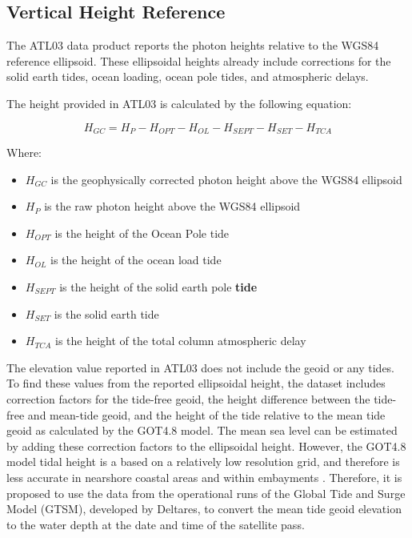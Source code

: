 \subsection{Vertical Height Reference}

The ATL03 data product reports the photon heights relative to the WGS84 reference ellipsoid. These ellipsoidal heights already include corrections for the solid earth tides, ocean loading, ocean pole tides, and atmospheric delays.

The height provided in ATL03 is calculated by the following equation:

\[H_{GC} =  H_{P} - H_{OPT} - H_{OL} - H_{SEPT} - H_{SET} - H_{TCA}\]

Where:

\begin{itemize}

      \item \(H_{GC}\) is the geophysically corrected photon height above the WGS84 ellipsoid
      \item \(H_{P}\) is the raw photon height above the WGS84 ellipsoid
      \item \(H_{OPT}\) is the height of the Ocean Pole tide
      \item \(H_{OL}\) is the height of the ocean load tide
      \item \(H_{SEPT}\) is the height of the solid earth pole \textbf{tide}
      \item \(H_{SET}\) is the solid earth tide
      \item \(H_{TCA}\) is the height of the total column atmospheric delay
\end{itemize}

The elevation value reported in ATL03 does not include the geoid or any tides. To find these values from the reported ellipsoidal height, the dataset includes correction factors for the tide-free geoid, the height difference between the tide-free and mean-tide geoid, and the height of the tide relative to the mean tide geoid as calculated by the GOT4.8 model. The mean sea level can be estimated by adding these correction factors to the ellipsoidal height. However, the GOT4.8 model tidal height is a based on a relatively low resolution grid, and therefore is less accurate in nearshore coastal areas and within embayments \parencite{Neumann2019e}. Therefore, it is proposed to use the data from the operational runs of the Global Tide and Surge Model (GTSM), developed by Deltares, to convert the mean tide geoid elevation to the water depth at the date and time of the satellite pass.

